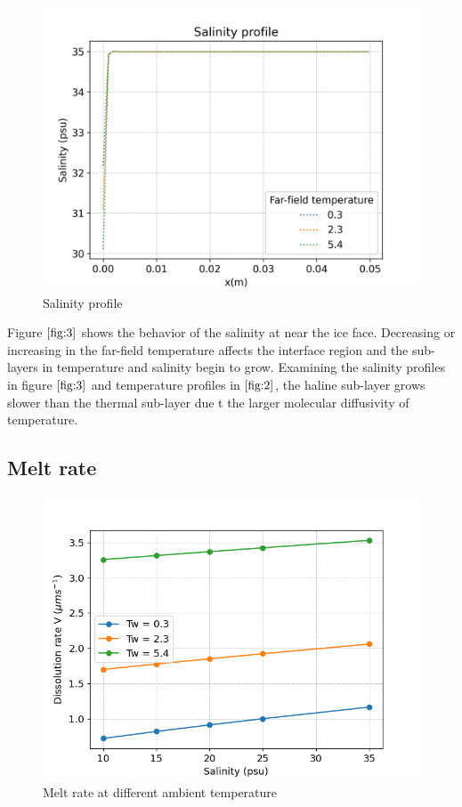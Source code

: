 \documentclass[11pt,a4paper]{article}
\begin{document}
	\begin{figure}[H]
	    \centering 
	    \includegraphics[width=12cm]{saltProfile}
	    \caption{Salinity profile}
	    \label{fig:3}
	\end{figure}
	
	Figure $\ref{fig:3}$ shows the behavior of the salinity at near the ice face. Decreasing or increasing in the far-field temperature affects the interface region and the sub-layers in temperature and salinity begin to grow. Examining the salinity profiles in figure $\ref{fig:3}$ and temperature profiles in $\ref{fig:2}$, the haline sub-layer grows slower than the thermal sub-layer due t the larger molecular diffusivity of temperature.
	
	\subsection{Melt rate}
	
	\begin{figure}[H]
	    \centering 
	    \includegraphics[width=12cm]{melt}
	    \caption{Melt rate at different ambient temperature}
	    \label{fig:4}
	\end{figure}
	
\end{document}
